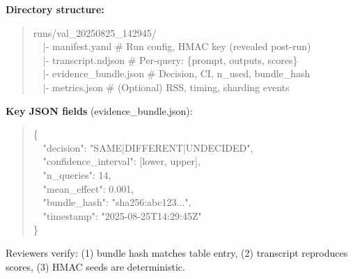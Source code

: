 \documentclass[11pt]{article}
\begin{document}
\noindent\textbf{Directory structure:}
\begin{quote}
\small
runs/val\_20250825\_142945/\\
~~|- manifest.yaml \hfill \# Run config, HMAC key (revealed post-run)\\
~~|- transcript.ndjson \hfill \# Per-query: \{prompt, outputs, scores\}\\
~~|- evidence\_bundle.json \hfill \# Decision, CI, n\_used, bundle\_hash\\
~~|- metrics.json \hfill \# (Optional) RSS, timing, sharding events
\end{quote}

\noindent\textbf{Key JSON fields} (evidence\_bundle.json):
\begin{quote}
\small
\{\\
~~"decision": "SAME|DIFFERENT|UNDECIDED",\\
~~"confidence\_interval": [lower, upper],\\
~~"n\_queries": 14,\\
~~"mean\_effect": 0.001,\\
~~"bundle\_hash": "sha256:abc123...",\\
~~"timestamp": "2025-08-25T14:29:45Z"\\
\}
\end{quote}

Reviewers verify: (1) bundle hash matches table entry, (2) transcript reproduces scores, (3) HMAC seeds are deterministic.
\end{document}
